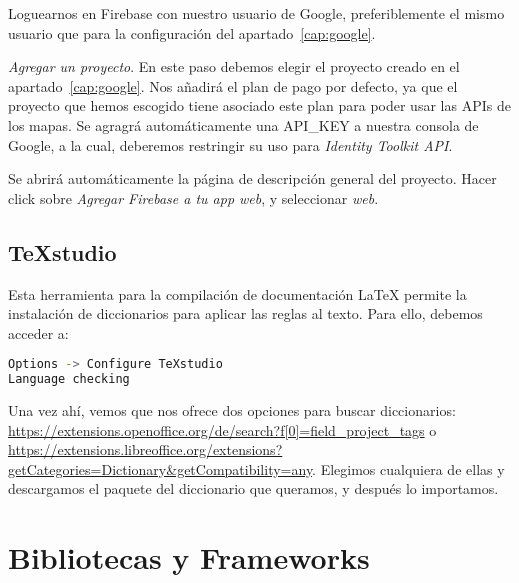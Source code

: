 \begin{steps}
	\item Loguearnos en Firebase con nuestro usuario de Google, preferiblemente el mismo usuario que para la configuración del apartado~\ref{cap:google}.
	\item \textit{Agregar un proyecto}. En este paso debemos elegir el proyecto creado en el apartado~\ref{cap:google}. Nos añadirá el plan de pago por defecto, ya que el proyecto que hemos escogido tiene asociado este plan para poder usar las APIs de los mapas. Se agragrá automáticamente una API\_KEY a nuestra consola de Google, a la cual, deberemos restringir su uso para \textit{Identity Toolkit API}.
	\item Se abrirá automáticamente la página de descripción general del proyecto. Hacer click sobre \textit{Agregar Firebase a tu app web}, y seleccionar \textit{web}.
\end{steps}


  
\subsection{\TeX studio}
Esta herramienta para la compilación de documentación \LaTeX{} permite la instalación de diccionarios para aplicar las reglas al texto. Para ello, debemos acceder a:

\renewcommand{\lstlistingname}{Configure \TeX studio}%
\renewcommand{\lstlistlistingname}{List of \lstlistingname s}
\begin{lstlisting}[language=bash,caption={Añadir diccionario}]
Options -> Configure TeXstudio
Language checking
\end{lstlisting}

Una vez ahí, vemos que nos ofrece dos opciones para buscar diccionarios: \url{https://extensions.openoffice.org/de/search?f[0]=field_project_tags} o \url{https://extensions.libreoffice.org/extensions?getCategories=Dictionary&getCompatibility=any}. Elegimos cualquiera de ellas y descargamos el paquete del diccionario que queramos, y después lo importamos.


\section{Bibliotecas y Frameworks}


